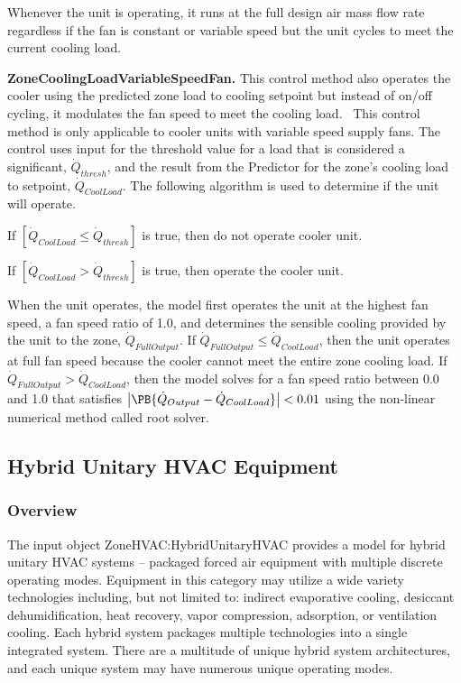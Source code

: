 Whenever the unit is operating, it runs at the full design air mass flow rate regardless if the fan is constant or variable speed but the unit cycles to meet the current cooling load.

\textbf{ZoneCoolingLoadVariableSpeedFan.} This control method also operates the cooler using the predicted zone load to cooling setpoint but instead of on/off cycling, it modulates the fan speed to meet the cooling load.~ This control method is only applicable to cooler units with variable speed supply fans. The control uses input for the threshold value for a load that is considered a significant, \({\dot Q_{thresh}}\), and the result from the Predictor for the zone's cooling load to setpoint, \({\dot Q_{CoolLoad}}\). The following algorithm is used to determine if the unit will operate.

If \(\left[ {{{\dot Q}_{CoolLoad}} \le {{\dot Q}_{thresh}}} \right]\) is true, then do not operate cooler unit.

If \(\left[ {{{\dot Q}_{CoolLoad}} > {{\dot Q}_{thresh}}} \right]\) is true, then operate the cooler unit.

When the unit operates, the model first operates the unit at the highest fan speed, a fan speed ratio of 1.0, and determines the sensible cooling provided by the unit to the zone, $\dot{Q}_{FullOutput}$. If $\dot{Q}_{FullOutput} \leq \dot Q_{CoolLoad}$, then the unit operates at full fan speed because the cooler cannot meet the entire zone cooling load. If $\dot{Q}_{FullOutput} > \dot{Q}_{CoolLoad}$, then the model solves for a fan speed ratio between 0.0 and 1.0 that satisfies $\left|\PB{\dot{Q}_{Output}-\dot{Q}_{CoolLoad}}\right| < 0.01$ using the non-linear numerical method called root solver.

\subsection{Hybrid Unitary HVAC Equipment}

\subsubsection{Overview}
The input object ZoneHVAC:HybridUnitaryHVAC provides a model for hybrid unitary HVAC systems – packaged forced air equipment with multiple discrete operating modes. Equipment in this category may utilize a wide variety technologies including, but not limited to: indirect evaporative cooling, desiccant dehumidification, heat recovery, vapor compression, adsorption, or ventilation cooling. Each hybrid system packages multiple technologies into a single integrated system. There are a multitude of unique hybrid system architectures, and each unique system may have numerous unique operating modes.

